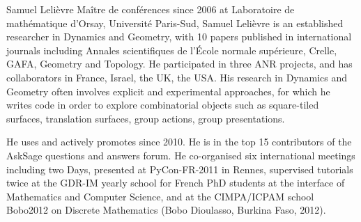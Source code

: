 \begin{participant}[type=R,PM=5,gender=male]{Samuel Lelièvre}
Maître de conférences since 2006 at
Laboratoire de mathématique d'Orsay, Université Paris-Sud,
Samuel Lelièvre is an established researcher in Dynamics and Geometry,
with 10 papers published in international journals including
Annales scientifiques de l'École normale supérieure,
Crelle, GAFA, Geometry and Topology.
He participated in three ANR projects, and has collaborators
in France, Israel, the UK, the USA.
His research in Dynamics and Geometry
often involves explicit and experimental approaches,
for which he writes code in order to explore
combinatorial objects such as square-tiled surfaces,
translation surfaces, group actions, group presentations.

He uses and actively promotes \Sage since 2010.
He is in the top 15 contributors of the AskSage
questions and answers forum.
He co-organised six international meetings including two \Sage Days,
presented \Sage at PyCon-FR-2011 in Rennes,
supervised \Sage tutorials twice at the GDR-IM yearly school
for French PhD students at the interface of Mathematics and
Computer Science, and at the CIMPA/ICPAM school Bobo2012
on Discrete Mathematics (Bobo Dioulasso, Burkina Faso, 2012).
\end{participant}
